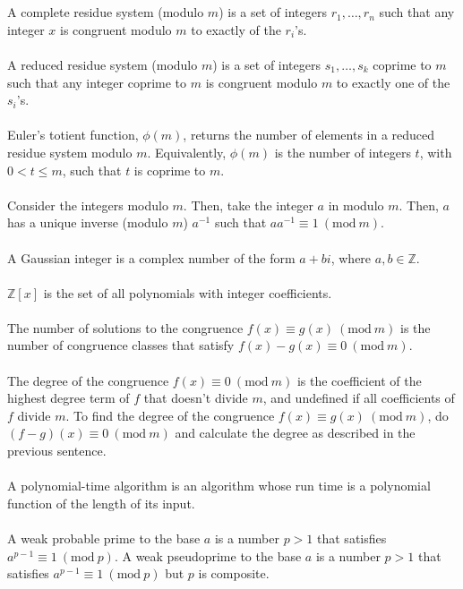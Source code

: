 \documentclass[12pt]{article}
\theoremstyle{definition}
\theoremstyle{named}
\newcommand{\Mod}[1]{\ (\mathrm{mod}\ #1)}
\begin{document}
\\
\\
A complete residue system (modulo $m$) is a set of integers $r_1,\dots,r_n$ such that any integer $x$ is congruent modulo $m$ to exactly of the $r_i$'s. 
\\
\\
A reduced residue system (modulo $m$) is a set of integers $s_1,\dots,s_k$ coprime to $m$ such that any integer coprime to $m$ is congruent modulo $m$ to exactly one of the $s_i$'s. 
\\
\\
Euler's totient function, $\phi(m)$, returns the number of elements in a reduced residue system modulo $m$. Equivalently, $\phi(m)$ is the number of integers $t$, with $0 < t \leq m$, such that $t$ is coprime to $m$. 
\\
\\
Consider the integers modulo $m$. Then, take the integer $a$ in modulo $m$. Then, $a$ has a unique inverse (modulo $m$) $a^{-1}$ such that $aa^{-1} \equiv 1 \Mod{m}$. 
\\
\\
A Gaussian integer is a complex number of the form $a + bi$, where $a,b \in \mathbb{Z}$. 
\\
\\
$\mathbb{Z}[x]$ is the set of all polynomials with integer coefficients.
\\
\\
The number of solutions to the congruence $f(x) \equiv g(x) \Mod{m}$ is the number of congruence classes that satisfy $f(x) - g(x) \equiv 0 \Mod{m}$. 
\\
\\
The degree of the congruence $f(x) \equiv 0 \Mod{m}$ is the coefficient of the highest degree term of $f$ that doesn't divide $m$, and undefined if all coefficients of $f$ divide $m$. To find the degree of the congruence $f(x) \equiv g(x) \Mod{m}$, do $(f-g)(x) \equiv 0 \Mod{m}$ and calculate the degree as described in the previous sentence. 
\\
\\
A polynomial-time algorithm is an algorithm whose run time is a polynomial function of the length of its input.
\\
\\
A weak probable prime to the base $a$ is a number $p>1$ that satisfies $a^{p-1} \equiv 1 \Mod{p}$. A weak pseudoprime to the base $a$ is a number $p>1$ that satisfies $a^{p-1} \equiv 1 \Mod{p}$ but $p$ is composite. 
\\
\end{document}
